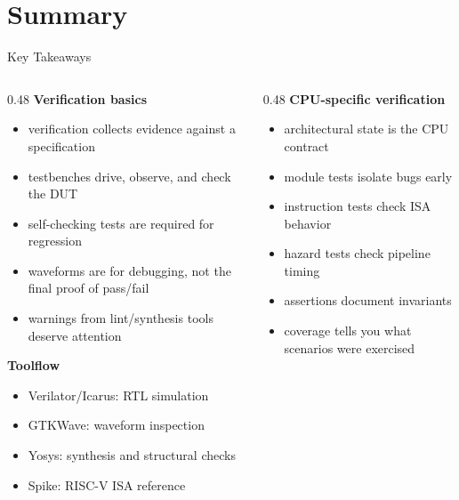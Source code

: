 \documentclass[aspectratio=169,10pt]{beamer}
\begin{document}
\section{Summary}

\begin{frame}{Key Takeaways}
  \begin{columns}[T]
    \begin{column}{0.48\textwidth}
      \textbf{Verification basics}
      \begin{itemize}
        \item verification collects evidence against a specification
        \item testbenches drive, observe, and check the DUT
        \item self-checking tests are required for regression
        \item waveforms are for debugging, not the final proof of pass/fail
        \item warnings from lint/synthesis tools deserve attention
      \end{itemize}

      \vspace{0.6em}
      \textbf{Toolflow}
      \begin{itemize}
        \item Verilator/Icarus: RTL simulation
        \item GTKWave: waveform inspection
        \item Yosys: synthesis and structural checks
        \item Spike: RISC-V ISA reference
      \end{itemize}
    \end{column}
    \begin{column}{0.48\textwidth}
      \textbf{CPU-specific verification}
      \begin{itemize}
        \item architectural state is the CPU contract
        \item module tests isolate bugs early
        \item instruction tests check ISA behavior
        \item hazard tests check pipeline timing
        \item assertions document invariants
        \item coverage tells you what scenarios were exercised
      \end{itemize}


\end{column}
\end{columns}
\end{frame}
\end{document}
